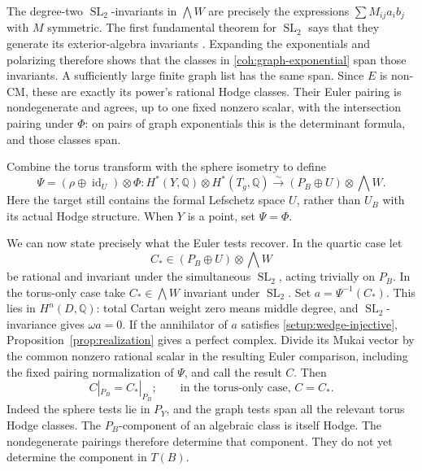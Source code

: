 \documentclass[11pt]{article}
\numberwithin{equation}{section}
\theoremstyle{definition}
\theoremstyle{remark}
\begin{document}
The degree-two \(\operatorname{SL}_2\)-invariants in \(\bigwedge W\) are precisely
the expressions \(\sum M_{ij}a_i b_j\) with \(M\) symmetric.  The
first fundamental theorem for \(\operatorname{SL}_2\) says that they generate its
exterior-algebra invariants \cite{WeylClassicalGroups}.  Expanding the exponentials and polarizing
therefore shows that the classes in
\eqref{coh:graph-exponential} span those invariants.  A sufficiently
large finite graph list has the same span.  Since \(E\) is non-CM,
these are exactly its power's rational Hodge classes.  Their Euler
pairing is nondegenerate and agrees, up to one fixed nonzero scalar,
with the intersection pairing under \(\Phi\): on pairs of graph
exponentials this is the determinant formula, and those classes span.

Combine the torus transform with the sphere isometry to define
\begin{equation}\label{coh:dictionary}
 \Psi=(\rho\oplus\operatorname{id}_U)\otimes\Phi:
 H^*(Y,\mathbb Q)\otimes H^*(T_g,\mathbb Q)
 \xrightarrow{\sim}(P_B\oplus U)\otimes\bigwedge W.
\end{equation}
Here the target still contains the formal Lefschetz space \(U\),
rather than \(U_B\) with its actual Hodge structure.  When \(Y\) is
a point, set \(\Psi=\Phi\).

We can now state precisely what the Euler tests recover.  In the
quartic case let
\begin{equation}\label{coh:input-space}
 C_*\in (P_B\oplus U)\otimes\bigwedge W
\end{equation}
be rational and invariant under the simultaneous \(\operatorname{SL}_2\), acting
trivially on \(P_B\).  In the torus-only case take
\(C_*\in\bigwedge W\) invariant under \(\operatorname{SL}_2\).
Set \(a=\Psi^{-1}(C_*)\).  This lies in \(H^n(D,\mathbb Q)\): total Cartan weight
zero means middle degree, and \(\operatorname{SL}_2\)-invariance gives
\(\omega a=0\).
If the annihilator of \(a\) satisfies
\eqref{setup:wedge-injective}, Proposition~\ref{prop:realization}
gives a perfect complex.  Divide its Mukai vector by the common
nonzero rational scalar in the resulting Euler comparison, including
the fixed pairing normalization of \(\Psi\), and call the result \(C\).
Then
\begin{equation}\label{coh:determined-component}
 C|_{P_B}=C_*|_{P_B};
 \qquad\text{in the torus-only case, }C=C_*.
\end{equation}
Indeed the sphere tests lie in \(P_Y\), and the graph tests span all
the relevant torus Hodge classes.  The \(P_B\)-component of an
algebraic class is itself Hodge.  The nondegenerate pairings therefore
determine that component.  They do not yet determine the component in
\(T(B)\).
\end{document}
